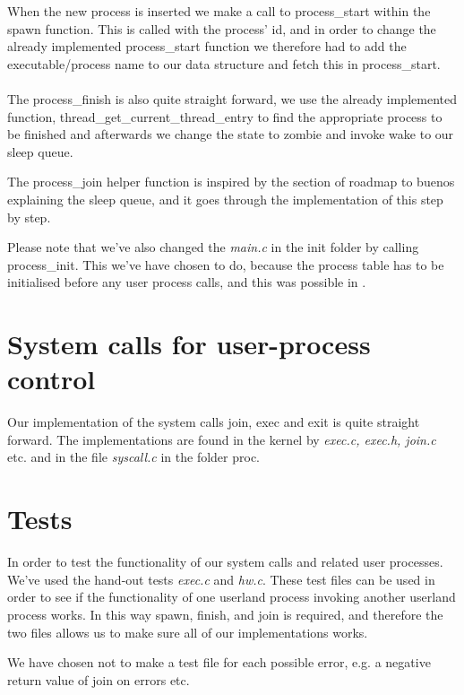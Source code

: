 \documentclass[12pt,a4paper,danish]{article}
\begin{document}
When the new process is inserted we make a call to process\_start within the spawn function. This is called with the process' id, and in order to change the already implemented process\_start function we therefore had to add the executable/process name to our data structure and fetch this in process\_start.\\\\
The process\_finish is also quite straight forward, we use the already implemented function, thread\_get\_current\_thread\_entry to find the appropriate process to be finished and afterwards we change the state to zombie and invoke wake to our sleep queue.

The process\_join helper function is inspired by the section of roadmap to buenos explaining the sleep queue, and it goes through the implementation of this step by step.

Please note that we've also changed the \textit{main.c} in the init folder by calling process\_init. This we've have chosen to do, because the process table has to be initialised before any user process calls, and this was possible in .

\section{System calls for user-process control}
Our implementation of the system calls join, exec and exit is quite straight forward. The implementations are found in the kernel by \textit{exec.c, exec.h, join.c} etc. and in the file \textit{syscall.c} in the folder proc.

\section{Tests}
In order to test the functionality of our system calls and related user processes. We've used the hand-out tests \textit{exec.c}  and \textit{hw.c}. These test files can be used in order to see if the functionality of one userland process invoking another userland process works. In this way spawn, finish, and join is required, and therefore the two files allows us to make sure all of our implementations works.

We have chosen not to make a test file for each possible error, e.g. a negative return value of join on errors etc.
\end{document}
